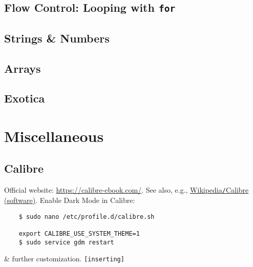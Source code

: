 \documentclass[oneside]{book}
\numberwithin{equation}{section}
\begin{document}
\section{Flow Control: Looping with \texttt{for}}


\section{Strings \& Numbers}


\section{Arrays}


\section{Exotica}


\chapter{Miscellaneous}

\section{Calibre}
Official website: \url{https://calibre-ebook.com/}. See also, e.g., \href{https://en.wikipedia.org/wiki/Calibre_(software)}{Wikipedia\texttt{/}Calibre (software)}. Enable Dark Mode in Calibre:
\begin{verbatim}
	$ sudo nano /etc/profile.d/calibre.sh
	
	export CALIBRE_USE_SYSTEM_THEME=1
	$ sudo service gdm restart
\end{verbatim}
\& further customization. \texttt{[inserting]}


\printbibliography[heading=bibintoc]
	
\end{document}
